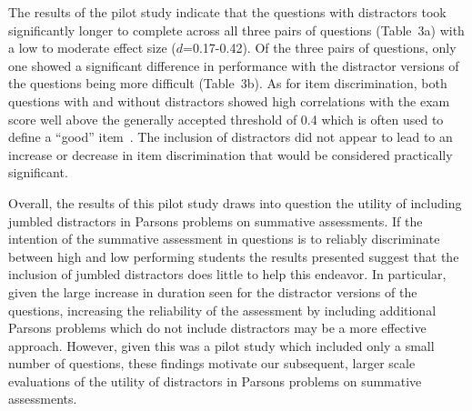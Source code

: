 \documentclass[authorversion,nonacm]{acmart}
\begin{document}


The results of the pilot study indicate that the questions with distractors
took significantly longer to complete across all three pairs of questions
(Table~3a) with a low to moderate effect size
($d$=0.17-0.42). Of the three pairs of questions, only one showed a significant
difference in performance with the distractor versions of the questions being
more difficult (Table~3b).  As for item discrimination,
both questions with and without distractors showed high correlations with the
exam score well above the generally accepted threshold of 0.4 which is often
used to define a ``good'' item~\cite{matlock1997basic}. The inclusion of
distractors did not appear to lead to an increase or decrease in item
discrimination that would be considered practically significant.

Overall, the results of this pilot study draws into question the utility of
including jumbled distractors in Parsons problems on summative assessments.
If the intention of the summative assessment in questions is to reliably
discriminate between high and low performing students the results presented
suggest that the inclusion of jumbled distractors does little to help this
endeavor. In particular, given the large increase in duration seen for the 
distractor versions of the questions, increasing the reliability of the
assessment by including additional Parsons problems which do not include
distractors may be a more effective approach.  However, given this was a pilot
study which included only a small number of questions, these findings motivate
our subsequent, larger scale evaluations of the utility of distractors in
Parsons problems on summative assessments.
\end{document}
